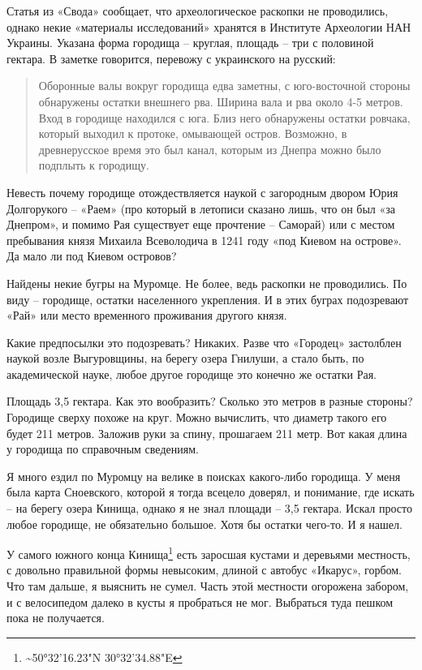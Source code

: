Статья из «Свода» сообщает, что археологическое раскопки не проводились, однако некие «материалы исследований» хранятся в Институте Археологии НАН Украины. Указана форма городища – круглая, площадь – три с половиной гектара. В заметке говорится, перевожу с украинского на русский:

\begin{quotation}
Оборонные валы вокруг городища едва заметны, с юго-восточной стороны обнаружены остатки внешнего рва. Ширина вала и рва около 4-5 метров. Вход в городище находился с юга. Близ него обнаружены остатки ровчака, который выходил к протоке, омывающей остров. Возможно, в древнерусское время это был канал, которым из Днепра можно было подплыть к городищу.
\end{quotation}

Невесть почему городище отождествляется наукой с загородным двором Юрия Долгорукого – «Раем» (про который в летописи сказано лишь, что он был «за Днепром», и помимо Рая существует еще прочтение – Саморай) или с местом пребывания князя Михаила Всеволодича в 1241 году «под Киевом на острове». Да мало ли под Киевом островов?

Найдены некие бугры на Муромце. Не более, ведь раскопки не проводились. По виду – городище, остатки населенного укрепления. И в этих буграх подозревают «Рай» или место временного проживания другого князя.

Какие предпосылки это подозревать? Никаких. Разве что «Городец» застолблен наукой возле Выгуровщины, на берегу озера Гнилуши, а стало быть, по академической науке, любое другое городище это конечно же остатки Рая.

Площадь 3,5 гектара. Как это вообразить? Сколько это метров в разные стороны? Городище сверху похоже на круг. Можно вычислить, что диаметр такого его будет 211 метров. Заложив руки за спину, прошагаем 211 метр. Вот какая длина у городища по справочным сведениям.

Я много ездил по Муромцу на велике в поисках какого-либо городища. У меня была карта Сноевского, которой я тогда всецело доверял, и понимание, где искать – на берегу озера Кинища, однако я не знал площади – 3,5 гектара. Искал просто любое городище, не обязательно большое. Хотя бы остатки чего-то. И я нашел.

У самого южного конца Кинища\footnote{\textasciitilde{}50°32'16.23"N 30°32'34.88"E} есть заросшая кустами и деревьями местность, с довольно правильной формы невысоким, длиной с автобус «Икарус», горбом. Что там дальше, я выяснить не сумел. Часть этой местности огорожена забором, и с велосипедом далеко в кусты я пробраться не мог. Выбраться туда пешком пока не получается.


